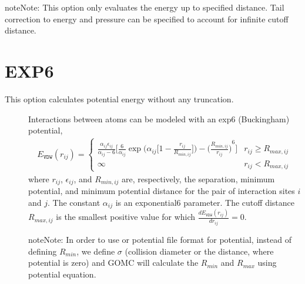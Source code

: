 \documentclass[letterpaper,10pt,english]{sphinxmanual}
\begin{document}
\begin{sphinxadmonition}{note}{Note:}
\sphinxAtStartPar
This option only evaluates the energy up to specified  distance. Tail correction to energy and pressure can be specified to account for infinite cutoff distance.
\end{sphinxadmonition}


\section{EXP6}
\label{\detokenize{vdw_energy:exp6}}
\sphinxAtStartPar
This option calculates potential energy without any truncation.
\begin{description}
\item[{}] \leavevmode
\sphinxAtStartPar
Interactions between atoms can be modeled with an exp\sphinxhyphen{}6 (Buckingham) potential,
\begin{equation*}
\begin{split}E_{\texttt{VDW}}(r_{ij}) =
\begin{cases}
  \frac{\alpha_{ij}\epsilon_{ij}}{\alpha_{ij}-6} \bigg[\frac{6}{\alpha_{ij}} \exp\bigg(\alpha_{ij} \bigg[1-\frac{r_{ij}}{R_{min,ij}} \bigg]\bigg) - {\bigg(\frac{R_{min,ij}}{r_{ij}}\bigg)}^6 \bigg] &  r_{ij} \geq R_{max,ij} \\
  \infty & r_{ij} < R_{max,ij}
\end{cases}\end{split}
\end{equation*}
\sphinxAtStartPar
where \(r_{ij}\), \(\epsilon_{ij}\), and \(R_{min,ij}\) are, respectively, the separation, minimum potential, and minimum potential distance for the pair of interaction sites \(i\) and \(j\).
The constant \(\alpha_{ij}\) is an  exponential\sphinxhyphen{}6 parameter. The cutoff distance \(R_{max,ij}\) is the smallest positive value for which \(\frac{dE_{\texttt{VDW}}(r_{ij})}{dr_{ij}}=0\).

\begin{sphinxadmonition}{note}{Note:}
\sphinxAtStartPar
In order to use  or  potential file format for  potential, instead of defining \(R_{min}\), we define \(\sigma\) (collision diameter or the distance, where potential is zero)
and GOMC will calculate the \(R_{min}\) and \(R_{max}\) using  potential equation.
\end{sphinxadmonition}


\end{description}
\end{document}
